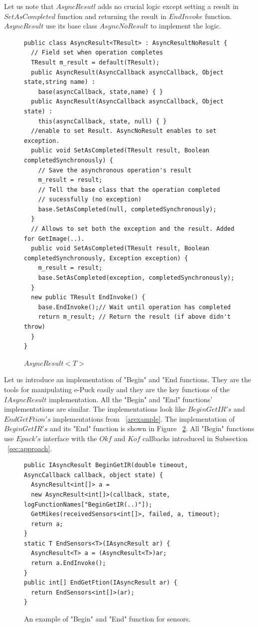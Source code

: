   Let us note that $AsyncResutl$ adds no crucial logic except setting a result in $SetAsCompleted$ function and
  returning the result in $EndInvoke$ function. 
  $AsyncResult$ use its base class $AsyncNoResult$ to implement the logic.
\begin{figure}[!hbp]
\begin{lstlisting}
public class AsyncResult<TResult> : AsyncResultNoResult {
  // Field set when operation completes
  TResult m_result = default(TResult);
  public AsyncResult(AsyncCallback asyncCallback, Object state,string name) : 
    base(asyncCallback, state,name) { }
  public AsyncResult(AsyncCallback asyncCallback, Object state) : 
    this(asyncCallback, state, null) { }
  //enable to set Result. AsyncNoResult enables to set exception.
  public void SetAsCompleted(TResult result, Boolean completedSynchronously) {
    // Save the asynchronous operation's result
    m_result = result;
    // Tell the base class that the operation completed 
    // sucessfully (no exception)
    base.SetAsCompleted(null, completedSynchronously);
  }
  // Allows to set both the exception and the result. Added for GetImage(..).
  public void SetAsCompleted(TResult result, Boolean completedSynchronously, Exception exception) {
    m_result = result;
    base.SetAsCompleted(exception, completedSynchronously);
  }
  new public TResult EndInvoke() {
    base.EndInvoke();// Wait until operation has completed 
    return m_result; // Return the result (if above didn't throw)
  }
}
\end{lstlisting}
\caption{$AsyncResult<T>$} \label{result}
\end{figure}

  Let us introduce an implementation of "Begin" and "End functions.
  They are the tools for manipulating e-Puck easily and they are the key functions of the $IAsyncResult$ implementation.
  All the "Begin" and "End" functions' implementations are similar. The implementations look like $BeginGetIR's$
  and $EndGetFtion's$ implementations from ~\ref{arexample}.
  The implementation of $BeginGetIR's$ and its "End" function is shown in Figure ~\ref{beginsens}.
  All "Begin" functions use $Epuck's$ interface with the $Okf$ and $Kof$ callbacks introduced
  in Subsection ~\ref{sec:approach}.	

\begin{figure}[!hbp]
\begin{lstlisting}
public IAsyncResult BeginGetIR(double timeout, AsyncCallback callback, object state) {
  AsyncResult<int[]> a = 
  new AsyncResult<int[]>(callback, state, logFunctionNames["BeginGetIR(..)"]);
  GetMikes(receivedSensors<int[]>, failed, a, timeout);
  return a;
}
static T EndSensors<T>(IAsyncResult ar) {
  AsyncResult<T> a = (AsyncResult<T>)ar;
  return a.EndInvoke();
}
public int[] EndGetFtion(IAsyncResult ar) { 
  return EndSensors<int[]>(ar); 
}
\end{lstlisting}	
\caption{An example of "Begin" and "End" function for sensors.}
\label{beginsens}
\end{figure}

